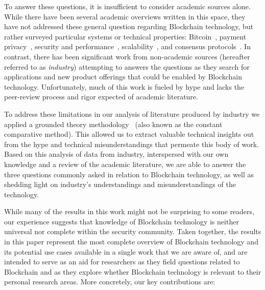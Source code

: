 To answer these questions, it is insufficient to consider academic sources alone.
While there have been several academic overviews written in this space, they have not addressed these general question regarding Blockchain technology, but rather surveyed particular systems or technical properties: Bitcoin~\cite{BMC+15,Narayanan17}, payment privacy~\cite{Conti17}, security and performance~\cite{Gervais16}, scalability~\cite{Croman16}, and consensus protocols~\cite{Bano17,garay2018consensus}.
In contrast, there has been significant work from non-academic sources (hereafter referred to as \emph{industry}) attempting to answers the questions as they search for applications and new product offerings that could be enabled by Blockchain technology.
Unfortunately, much of this work is fueled by hype and lacks the peer-review process and rigor expected of academic literature.

To address these limitations in our analysis of literature produced by industry we applied a grounded theory methodology~\cite{glaser1965constant,strauss1990basics,corbin1990grounded} (also known as the constant comparative method).
This allowed us to extract valuable technical insights out from the hype and technical misunderstandings that permeate this body of work.
Based on this analysis of data from industry, interspersed with our own knowledge and a review of the academic literature, we are able to answer the three questions commonly asked in relation to Blockchain technology, as well as shedding light on industry's understandings and misunderstandings of the technology. 

While many of the results in this work might not be surprising to some readers, our experience suggests that knowledge of Blockchain technology is neither universal nor complete within the security community.
Taken together, the results in this paper represent the most complete overview of Blockchain technology and its potential use cases available in a single work that we are aware of, and are intended to serve as an aid for researchers as they field questions related to Blockchain and as they explore whether Blockchain technology is relevant to their personal research areas. More concretely, our key contributions are:


